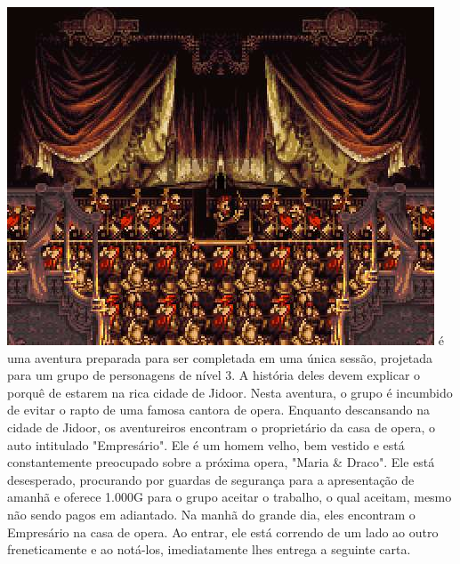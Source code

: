 %
%
\vfill
%
\includegraphics[width=\columnwidth]{./art/mariaanddraco/opera.jpg}
%
\vfill
%
 é uma aventura preparada para ser completada em uma única sessão, projetada para um grupo de personagens de nível 3. 
A história deles devem explicar o porquê de estarem na rica cidade de Jidoor.
Nesta aventura, o grupo é incumbido de evitar o rapto de uma famosa cantora de opera.
%
\vfill
%
%
\vfill
%
Enquanto descansando na cidade de Jidoor, os aventureiros encontram o proprietário da casa de opera, o auto intitulado "Empresário".
Ele é um homem velho, bem vestido e está constantemente preocupado sobre a próxima opera, "Maria \& Draco".
Ele está desesperado, procurando por guardas de segurança para a apresentação de amanhã e oferece 1.000G para o grupo aceitar o trabalho, o qual aceitam, mesmo não sendo pagos em adiantado.
Na manhã do grande dia, eles encontram o Empresário na casa de opera. Ao entrar, ele está correndo de um lado ao outro freneticamente e ao notá-los, imediatamente lhes entrega a seguinte carta.\\
